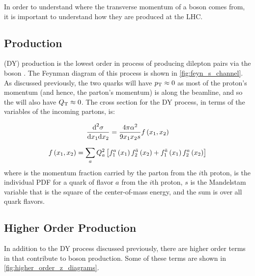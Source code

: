 In order to understand where the transverse momentum of a \Z boson comes from,
it is important to understand how they are produced at the LHC.

\subsection{\DrellYan Production}
\label{ssec:dy_production}

\DrellYan (DY) production is the lowest order in \alphastrong process of
producing dilepton pairs via the \Z boson \cite{drell_1970,drell_1970a}. The
Feynman diagram of this process is shown in \cref{fig:feyn_s_channel}. As
discussed previously, the two quarks will have $p_{\mathrm{T}} \approx 0$ as most of the
proton's momentum (and hence, the parton's momentum) is along the beamline, and
so the \Z will also have $Q_{\mathrm{T}} \approx 0$. The cross section for the DY
process, in terms of the  variables of the incoming partons, is:

\begin{equation}\label{eq:drell_yan_cross_section}
    \frac{\text{d}^{2}\sigma}
    {\text{d}x_{1} \text{d}x_{2}}
    =
    \frac{4 \pi \alpha^{2}}
    {9 x_{1} x_{2} s}
    f \left( x_{1}, x_{2} \right)
\end{equation}

\begin{equation}\label{eq:fx}
    f \left( x_{1}, x_{2} \right)
    =
    \sum_{a}
    Q^{2}_{a}
    \left[
        f^{a}_{1} \left( x_{1} \right)
        f^{\bar{a}}_{2} \left( x_{2} \right)
        +
        f^{\bar{a}}_{1} \left( x_{1} \right)
        f^{a}_{2} \left( x_{2} \right)
    \right]
\end{equation}
%
where  is the momentum fraction carried by the parton from the
$i$th proton,  is the individual PDF for a quark of
flavor $a$ from the $i$th proton, $s$ is the Mandelstam variable that is the
square of the center-of-mass energy, and the sum is over all quark flavors.



\subsection{Higher Order Production}
\label{ssec:higher_order}

In addition to the DY process discussed previously, there are higher order
terms in \alphastrong that contribute to \Z boson production. Some of these
terms are shown in \cref{fig:higher_order_z_diagrams}.

